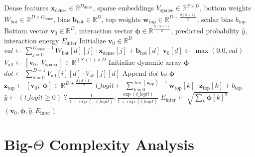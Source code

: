 \documentclass[11pt,a4paper]{article}
\theoremstyle{definition}
\begin{document}
\begin{algorithm}[H]
\caption{DLRM Dual-Stream Evaluation, Gramian Interaction, and Top MLP Scoring}
\begin{algorithmic}[1]
\Require Dense features $\mathbf{x}_{\text{dense}} \in \mathbb{R}^{D_{\text{dense}}}$, sparse embeddings $V_{\text{sparse}} \in \mathbb{R}^{S \times D}$, bottom weights $W_{\text{bot}} \in \mathbb{R}^{D \times D_{\text{dense}}}$, bias $\mathbf{b}_{\text{bot}} \in \mathbb{R}^D$, top weights $\mathbf{w}_{\text{top}} \in \mathbb{R}^{D + \frac{S(S+1)}{2}}$, scalar bias $b_{\text{top}}$
\Ensure Bottom vector $\mathbf{v}_0 \in \mathbb{R}^D$, interaction vector $\boldsymbol{\phi} \in \mathbb{R}^{\frac{S(S+1)}{2}}$, predicted probability $\widehat{y}$, interaction energy $E_{\text{inter}}$
\State Initialize $\mathbf{v}_0 \in \mathbb{R}^D$
 
    \State $val \gets \sum_{j=0}^{D_{\text{dense}}-1} W_{\text{bot}}[d][j] \cdot \mathbf{x}_{\text{dense}}[j] + \mathbf{b}_{\text{bot}}[d]$
    \State $\mathbf{v}_0[d] \gets \max(0.0, val)$
\EndFor
\State $V_{\text{all}} \gets [\mathbf{v}_0; \; V_{\text{sparse}}] \in \mathbb{R}^{(S+1) \times D}$ 
\State Initialize dynamic array $\boldsymbol{\phi}$
 
        \State $dot \gets \sum_{d=0}^{D-1} V_{\text{all}}[i][d] \cdot V_{\text{all}}[j][d]$
        \State Append $dot$ to $\boldsymbol{\phi}$
    \EndFor
\EndFor
\State $\mathbf{z}_{\text{top}} \gets [\mathbf{v}_0; \; \boldsymbol{\phi}] \in \mathbb{R}^{D + \frac{S(S+1)}{2}}$
\State $t\_logit \gets \sum_{k=0}^{\operatorname{len}(\mathbf{z}_{\text{top}})-1} \mathbf{w}_{\text{top}}[k] \cdot \mathbf{z}_{\text{top}}[k] + b_{\text{top}}$ 
\State $\widehat{y} \gets (t\_logit \ge 0) \;?\; \frac{1}{1 + \exp(-t\_logit)} : \frac{\exp(t\_logit)}{1 + \exp(t\_logit)}$
\State $E_{\text{inter}} \gets \sqrt{\sum_{k} \boldsymbol{\phi}[k]^2}$
\State \Return $(\mathbf{v}_0, \boldsymbol{\phi}, \widehat{y}, E_{\text{inter}})$
\end{algorithmic}
\end{algorithm}

\section{Big-$\Theta$ Complexity Analysis}
\end{document}
